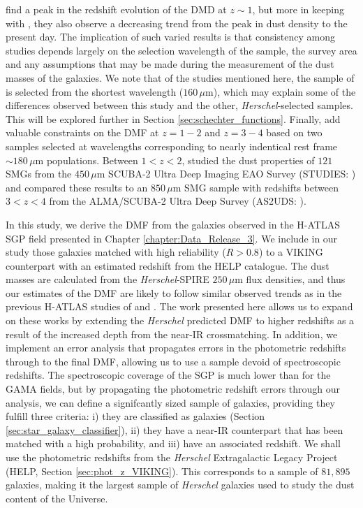 find a peak in the redshift evolution of the DMD at $z \sim 1$, but more in keeping with \citealt{Dunne_2011}, they also observe a decreasing trend from the peak in dust density to the present day. The implication of such varied results is that consistency among studies depends largely on the selection wavelength of the sample, the survey area and any assumptions that may be made during the measurement of the dust masses of the galaxies. We note that of the studies mentioned here, the sample of \citealt{Pozzi_2020} is selected from the shortest wavelength ($160\,\mu$m), which may explain some of the differences observed between this study and the other, \textit{Herschel}-selected samples. This will be explored further in Section \ref{sec:schechter_functions}. Finally, \citealt{Dudzeviciute_2021} add valuable constraints on the DMF at $z = 1 - 2$ and $z = 3 - 4$ based on two samples selected at wavelengths corresponding to nearly indentical rest frame $\sim 180\,\mu$m populations. Between $1 < z < 2$, \citealt{Dudzeviciute_2021} studied the dust properties of $121$ SMGs from the $450\,\mu$m SCUBA-2 Ultra Deep Imaging EAO Survey (STUDIES: \citealt{Wang_2017, Chang_2018, Lim_2020b, Lim_2020c}) and compared these results to an $850\,\mu$m SMG sample with redshifts between $3 < z < 4$ from the ALMA/SCUBA-2 Ultra Deep Survey (AS2UDS: \citealt{Stach_2018, Stach_2019, Dudzeviciute_2020}). 

In this study, we derive the DMF from the galaxies observed in the H-ATLAS SGP field presented in Chapter \ref{chapter:Data_Release_3}. We include in our study those galaxies matched with high reliability ($R > 0.8$) to a VIKING counterpart with an estimated redshift from the HELP catalogue. The dust masses are calculated from the \textit{Herschel}-SPIRE $250\,\mu$m flux densities, and thus our estimates of the DMF are likely to follow similar observed trends as in the previous H-ATLAS studies of \citealt{Dunne_2011} and \citealt{Beeston_2018}. The work presented here allows us to expand on these works by extending the \textit{Herschel} predicted DMF to higher redshifts as a result of the increased depth from the near-IR crossmatching. In addition, we implement an error analysis that propagates errors in the photometric redshifts through to the final DMF, allowing us to use a sample devoid of spectroscopic redshifts. The spectroscopic coverage of the SGP is much lower than for the GAMA fields, but by propagating the photometric redshift errors through our analysis, we can define a signifcantly sized sample of galaxies, providing they fulfill three criteria: i) they are classified as galaxies (Section \ref{sec:star_galaxy_classifier}), ii) they have a near-IR counterpart that has been matched with a high probability, and iii) have an associated redshift. We shall use the photometric redshifts from the \textit{Herschel} Extragalactic Legacy Project (HELP, Section \ref{sec:phot_z_VIKING}). This corresponds to a sample of $81,895$ galaxies, making it the largest sample of \textit{Herschel} galaxies used to study the dust content of the Universe.

